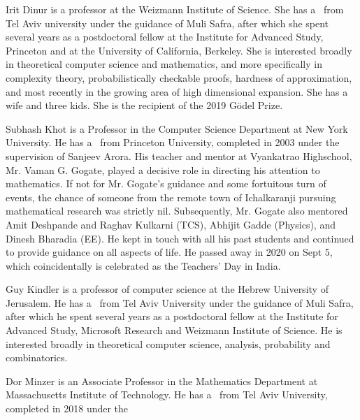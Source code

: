 \documentclass{toc}
\begin{document}
%
%
%
%
%
%
%
%
%
%
%
%
%
%
%
%
%
%
%
%
\begin{tocaboutauthors}
\begin{tocabout}[dinur]
Irit Dinur is a professor at the Weizmann Institute of Science. 
She has a \phd\ from Tel Aviv university under the guidance of Muli Safra, after
which she spent several years as a postdoctoral fellow 
at the Institute for Advanced Study, Princeton and at
the  %
University of California, Berkeley.
She is interested
broadly in theoretical computer science and mathematics, and more specifically in
complexity theory, probabilistically checkable proofs, hardness of approximation,
and most recently in the growing area of high dimensional expansion. She has a
wife and three kids. She is the %
recipient  %
of the 2019 G\"{o}del Prize.  %
%
%
\end{tocabout}
\begin{tocabout}[khot]  %
Subhash Khot is a Professor in the Computer Science Department at New York University.
He has a \phd\ from Princeton University, completed in 2003 under the supervision of Sanjeev Arora.
His teacher and mentor at Vyankatrao Highschool, Mr. Vaman G. Gogate,
%
played a decisive role in directing his attention to mathematics. If not for Mr. Gogate’s guidance and some fortuitous turn of events, the chance of someone from the remote town of Ichalkaranji pursuing mathematical research was strictly nil. Subsequently, Mr. Gogate also mentored Amit Deshpande and Raghav Kulkarni (TCS), Abhijit Gadde (Physics), and Dinesh Bharadia (EE). He kept in touch with all his past students and continued to provide guidance on all aspects of life. He passed away in 2020 on Sept 5, which %
coincidentally  %
is celebrated as the Teachers' Day in India. %
\end{tocabout}
\begin{tocabout}[kindler]
Guy Kindler is a professor of computer science at the Hebrew University of Jerusalem. 
He has a \phd\ from Tel Aviv University under the guidance of Muli Safra, 
after which he
spent  %
several years as a postdoctoral fellow at
the Institute for Advanced Study, Microsoft Research and Weizmann Institute of Science.
He is interested broadly in theoretical computer science,
analysis, probability and combinatorics.  %
\end{tocabout}
\begin{tocabout}[minzer]
Dor Minzer is an Associate Professor in the Mathematics Department at Massachusetts Institute of Technology. He has a \phd\ from Tel Aviv University, completed in 2018 under the

\end{tocabout}
\end{tocaboutauthors}
\end{document}
